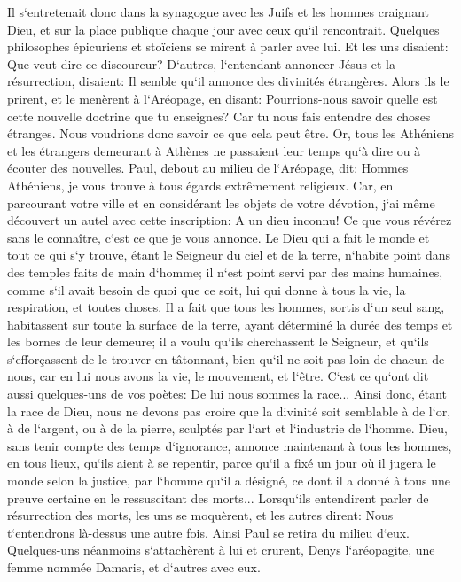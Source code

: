\verse Il s`entretenait donc dans la synagogue avec les Juifs et les hommes craignant Dieu, et sur la place publique chaque jour avec ceux qu`il rencontrait. 
\verse Quelques philosophes épicuriens et stoïciens se mirent à parler avec lui. Et les uns disaient: Que veut dire ce discoureur? D`autres, l`entendant annoncer Jésus et la résurrection, disaient: Il semble qu`il annonce des divinités étrangères. 
\verse Alors ils le prirent, et le menèrent à l`Aréopage, en disant: Pourrions-nous savoir quelle est cette nouvelle doctrine que tu enseignes? 
\verse Car tu nous fais entendre des choses étranges. Nous voudrions donc savoir ce que cela peut être. 
\verse Or, tous les Athéniens et les étrangers demeurant à Athènes ne passaient leur temps qu`à dire ou à écouter des nouvelles. 
\verse Paul, debout au milieu de l`Aréopage, dit: Hommes Athéniens, je vous trouve à tous égards extrêmement religieux. 
\verse Car, en parcourant votre ville et en considérant les objets de votre dévotion, j`ai même découvert un autel avec cette inscription: A un dieu inconnu! Ce que vous révérez sans le connaître, c`est ce que je vous annonce. 
\verse Le Dieu qui a fait le monde et tout ce qui s`y trouve, étant le Seigneur du ciel et de la terre, n`habite point dans des temples faits de main d`homme; 
\verse il n`est point servi par des mains humaines, comme s`il avait besoin de quoi que ce soit, lui qui donne à tous la vie, la respiration, et toutes choses. 
\verse Il a fait que tous les hommes, sortis d`un seul sang, habitassent sur toute la surface de la terre, ayant déterminé la durée des temps et les bornes de leur demeure; 
\verse il a voulu qu`ils cherchassent le Seigneur, et qu`ils s`efforçassent de le trouver en tâtonnant, bien qu`il ne soit pas loin de chacun de nous, 
\verse car en lui nous avons la vie, le mouvement, et l`être. C`est ce qu`ont dit aussi quelques-uns de vos poètes: De lui nous sommes la race... 
\verse Ainsi donc, étant la race de Dieu, nous ne devons pas croire que la divinité soit semblable à de l`or, à de l`argent, ou à de la pierre, sculptés par l`art et l`industrie de l`homme. 
\verse Dieu, sans tenir compte des temps d`ignorance, annonce maintenant à tous les hommes, en tous lieux, qu`ils aient à se repentir, 
\verse parce qu`il a fixé un jour où il jugera le monde selon la justice, par l`homme qu`il a désigné, ce dont il a donné à tous une preuve certaine en le ressuscitant des morts... 
\verse Lorsqu`ils entendirent parler de résurrection des morts, les uns se moquèrent, et les autres dirent: Nous t`entendrons là-dessus une autre fois. 
\verse Ainsi Paul se retira du milieu d`eux. 
\verse Quelques-uns néanmoins s`attachèrent à lui et crurent, Denys l`aréopagite, une femme nommée Damaris, et d`autres avec eux. 

